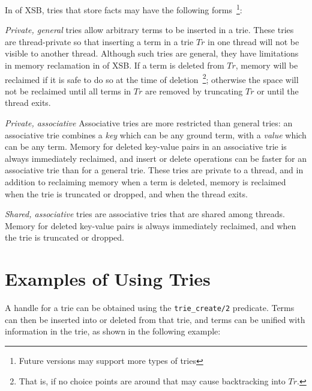 In \version{} of XSB, tries that store facts may have the following
forms~\footnote{Future versions may support more types of tries}:
%
\bi
\item {\em Private, general} tries allow arbitrary terms to be
  inserted in a trie.  These tries are thread-private so that
  inserting a term in a trie $Tr$ in one thread will not be visible to
  another thread.  Although such tries are general, they have
  limitations in memory reclamation in \version{} of XSB.  If a term
  is deleted from $Tr$, memory will be reclaimed if it is safe to do
  so at the time of deletion~\footnote{That is, if no choice points
    are around that may cause backtracking into $Tr$.}; otherwise the
  space will not be reclaimed until all terms in $Tr$ are removed by
  truncating $Tr$ or until the thread exits.

\item {\em Private, associative} Associative tries are more restricted
  than general tries: an associative trie combines a {\em key} which
  can be any ground term, with a {\em value} which can be any term.
  Memory for deleted key-value pairs in an associative trie is always
  immediately reclaimed, and insert or delete operations can be faster
  for an associative trie than for a general trie.  These tries are
  private to a thread, and in addition to reclaiming memory when a
  term is deleted, memory is reclaimed when the trie is truncated or
  dropped, and when the thread exits.

\item {\em Shared, associative} tries are associative tries that are
  shared among threads.  Memory for deleted key-value pairs is always
  immediately reclaimed, and when the trie is truncated or dropped.
  \ei

\section{Examples of Using Tries}

A handle for a trie can be obtained using the {\tt trie\_create/2}
predicate.  Terms can then be inserted into or deleted from that trie,
and terms can be unified with information in the trie, as shown in the
following example:

